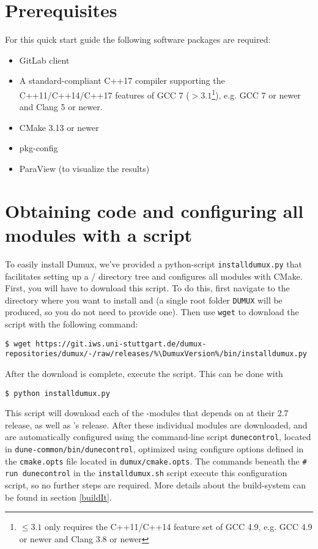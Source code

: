 \section{Prerequisites} \label{sec:prerequisites}
For this quick start guide the following software packages are required:
\begin{itemize}
\item GitLab client
\item A standard-compliant C++17 compiler supporting the C++11/C++14/C++17 features of GCC 7
(\Dumux $> 3.1$\footnote{\Dumux $\leq 3.1$ only requires the C++11/C++14 feature set of GCC 4.9,
e.g. GCC 4.9 or newer and Clang 3.8 or newer}), e.g. GCC 7 or newer and Clang 5 or newer.
\item CMake 3.13 or newer
\item pkg-config
\item ParaView (to visualize the results)
\end{itemize}

\section{Obtaining code and configuring all modules with a script}
To easily install Dumux, we've provided a python-script \texttt{installdumux.py} that facilitates
setting up a {\Dune}/{\Dumux} directory tree and configures all modules with CMake.
First, you will have to download this script. To do this, first navigate to the directory where you
want to install \Dumux and \Dune (a single root folder \texttt{DUMUX} will be produced, so you do
not need to provide one). Then use \texttt{wget} to download the script with the following command:
\begin{lstlisting}[style=Bash,escapechar=\%]
$ wget https://git.iws.uni-stuttgart.de/dumux-repositories/dumux/-/raw/releases/%\DumuxVersion%/bin/installdumux.py
\end{lstlisting}

After the download is complete, execute the script. This can be done with
\begin{lstlisting}[style=Bash]
$ python installdumux.py
\end{lstlisting}

This script will download each of the \Dune-modules that \Dumux depends on at their 2.7 release,
as well as \Dumux's \DumuxVersion release. After these individual modules are downloaded, \Dune and \Dumux
are automatically configured using the command-line script \texttt{dunecontrol}, located in
\texttt{dune-common/bin/dunecontrol}, optimized using configure options defined in the \texttt{cmake.opts}
file located in \texttt{dumux/cmake.opts}. The commands beneath the \texttt{\# run dunecontrol} in
the \texttt{installdumux.sh} script execute this configuration script, so no further steps are required.
More details about the build-system can be found in section \ref{buildIt}.

